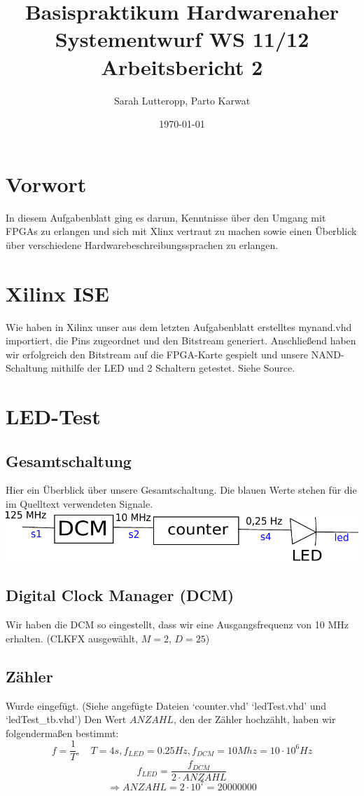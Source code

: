 \documentclass[a4paper, 11pt]{article}
\author{Sarah Lutteropp, Parto Karwat}
\title{Basispraktikum Hardwarenaher Systementwurf WS 11/12 \\ Arbeitsbericht 2}
\date{\today}
\theoremstyle{definition}
\theoremstyle{plain}
\begin{document}
\maketitle

\section{Vorwort}
In diesem Aufgabenblatt ging es darum, Kenntnisse über den Umgang mit FPGAs zu erlangen und sich mit Xlinx vertraut zu machen sowie einen Überblick über verschiedene Hardwarebeschreibungssprachen zu erlangen.

\section{Xilinx ISE}
Wie haben in Xilinx unser aus dem letzten Aufgabenblatt erstelltes mynand.vhd importiert, die Pins zugeordnet und den Bitstream generiert. Anschließend haben wir erfolgreich den Bitstream auf die FPGA-Karte gespielt und unsere NAND-Schaltung mithilfe der LED und 2 Schaltern getestet. 
Siehe Source.

\section{LED-Test}
\subsection{Gesamtschaltung}
Hier ein Überblick über unsere Gesamtschaltung. Die blauen Werte stehen für die im Quelltext verwendeten Signale.
\newline
\includegraphics[width=1\textwidth]{partosBild.pdf}

\subsection{Digital Clock Manager (DCM)}
Wir haben die DCM so eingestellt, dass wir eine Ausgangsfrequenz von 10 MHz erhalten. (CLKFX ausgewählt, $M=2$, $D=25$)

\subsection{Zähler}
Wurde eingefügt. (Siehe angefügte Dateien `counter.vhd' `ledTest.vhd' und `ledTest\_tb.vhd')
Den Wert $ANZAHL$, den der Zähler hochzählt, haben wir folgendermaßen bestimmt:
$$f=\frac{1}{T}, \quad T=4 s, f_{LED} = 0.25 Hz, f_{DCM} = 10 Mhz = 10 \cdot 10^6 Hz$$
$$ f_{LED} = \frac{f_{DCM}}{2 \cdot ANZAHL}$$
$$\Rightarrow ANZAHL = 2 \cdot 10^7 = 20000000$$
\end{document}
